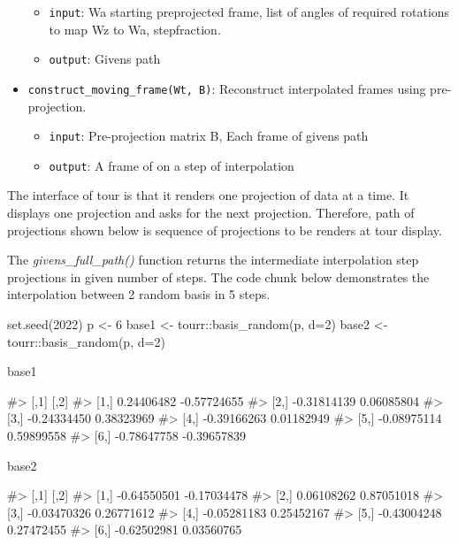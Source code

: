 \begin{itemize}
  \begin{itemize}
  \tightlist
  \item
    \texttt{input}: Wa starting preprojected frame, list of angles of
    required rotations to map Wz to Wa, stepfraction.
  \item
    \texttt{output}: Givens path
  \end{itemize}
\item
  \texttt{construct\_moving\_frame(Wt,\ B)}: Reconstruct interpolated
  frames using pre-projection.

  \begin{itemize}
  \tightlist
  \item
    \texttt{input}: Pre-projection matrix B, Each frame of givens path
  \item
    \texttt{output}: A frame of on a step of interpolation
  \end{itemize}
\end{itemize}

The interface of tour is that it renders one projection of data at a
time. It displays one projection and asks for the next projection.
Therefore, path of projections shown below is sequence of projections to
be renders at tour display.

The \emph{givens\_full\_path()} function returns the intermediate
interpolation step projections in given number of steps. The code chunk
below demonstrates the interpolation between 2 random basis in 5 steps.

\begin{Schunk}
\begin{Sinput}
set.seed(2022)
p <- 6
base1 <- tourr::basis_random(p, d=2)
base2 <- tourr::basis_random(p, d=2)

base1
\end{Sinput}
\begin{Soutput}
#>             [,1]        [,2]
#> [1,]  0.24406482 -0.57724655
#> [2,] -0.31814139  0.06085804
#> [3,] -0.24334450  0.38323969
#> [4,] -0.39166263  0.01182949
#> [5,] -0.08975114  0.59899558
#> [6,] -0.78647758 -0.39657839
\end{Soutput}
\begin{Sinput}
base2
\end{Sinput}
\begin{Soutput}
#>             [,1]        [,2]
#> [1,] -0.64550501 -0.17034478
#> [2,]  0.06108262  0.87051018
#> [3,] -0.03470326  0.26771612
#> [4,] -0.05281183  0.25452167
#> [5,] -0.43004248  0.27472455
#> [6,] -0.62502981  0.03560765
\end{Soutput}
\end{Schunk}

